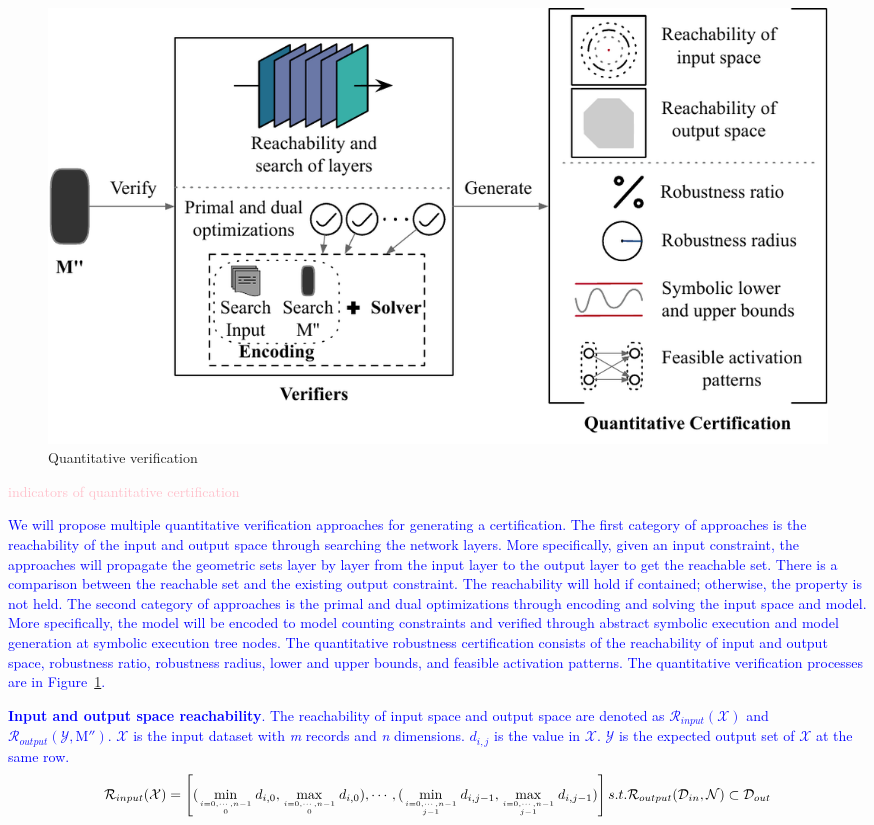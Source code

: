 \begin{figure}[t]
    \centering
    \includegraphics[scale=0.75]{fig/task4.pdf}
    \caption{Quantitative verification}
    \label{fig:task4}
\end{figure}

\textcolor{pink}{indicators of quantitative certification}

\textcolor{blue}{We will propose multiple quantitative verification approaches for generating a certification. The first category of approaches is the reachability of the input and output space through searching the network layers. More specifically, given an input constraint, the approaches will propagate the geometric sets layer by layer from the input layer to the output layer to get the reachable set. There is a comparison between the reachable set and the existing output constraint. The reachability will hold if contained; otherwise, the property is not held. The second category of approaches is the primal and dual optimizations through encoding and solving the input space and model. More specifically, the model will be encoded to model counting constraints and verified through abstract symbolic execution and model generation at symbolic execution tree nodes. The quantitative robustness certification consists of the reachability of input and output space, robustness ratio, robustness radius, lower and upper bounds, and feasible activation patterns. The quantitative verification processes are in Figure~\ref{fig:task4}.}

\textcolor{blue}{\textbf{Input and output space reachability}.  The reachability of input space and output space are denoted as $\mathcal{R}_{input}(\mathcal{X})$ and $\mathcal{R}_{output}(\mathcal{Y}, \mathrm{M}'')$. $\mathcal{X}$ is the input dataset with \emph{m} records and \emph{n} dimensions. $d_{i,j}$ is the value in $\mathcal{X}$. $\mathcal{Y}$ is the expected output set of $\mathcal{X}$ at the same row. }
\begin{equation}
\mathcal{R}_{input}(\mathcal{X})=\left[ (\min_{\genfrac{}{}{0pt}{2}{i=0,\dotsm,n-1} {0}} d_{i, 0},\max_{\genfrac {}{}{0pt}{2}{i=0,\dotsm, n-1 }{0}} d_{i, 0}),\dotsm, (\min_{\genfrac{}{}{0pt}{2}{i=0,\dotsm, n-1}{j-1}}d_{i, j-1},\max_{\genfrac {}{}{0pt}{2}{i=0,\dotsm, n-1}{j-1}} d_{i, j-1}) \right] s.t. \mathcal{R}_{output}(\mathcal{D}_{in}, \mathcal{N}) \subset \mathcal{D}_{out}
\end{equation}



